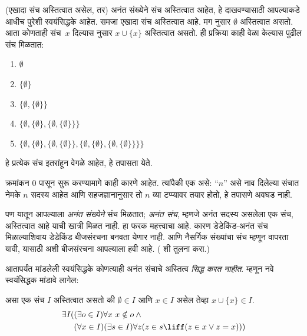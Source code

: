 \documentclass[../../../include/open-logic-section]{subfiles}
\begin{document}

(एखादा संच अस्तित्वात असेल, तर) अनंत संख्येने संच अस्तित्वात आहेत, हे दाखवण्यासाठी आपल्याकडे आधीच पुरेशी स्वयंसिद्धके आहेत. समजा एखादा संच अस्तित्वात आहे. मग  नुसार $\emptyset$ अस्तित्वात असतो. आता कोणताही संच~$x$ दिल्यास  नुसार $x \cup \{x\}$ अस्तित्वात असतो. ही प्रक्रिया काही वेळा केल्यास पुढील संच मिळतात:
\begin{enumerate}
	\item[0.] $\emptyset$ %
	\item[1.] $ \{\emptyset\}$ %
	\item[2.] $\{\emptyset, \{\emptyset\}\}$ %
	\item[3.] $\{\emptyset, \{\emptyset\}, \{\emptyset, \{\emptyset\}\}\}$ %
	\item[4.] $\{\emptyset, \{\emptyset\}, \{\emptyset, \{\emptyset\}\}, \{\emptyset, \{\emptyset\}, \{\emptyset, \{\emptyset\}\}\}\}$%
\end{enumerate}
हे प्रत्येक संच इतरांहून वेगळे आहेत, हे तपासता येते.

क्रमांकन $0$ पासून सुरू करण्यामागे काही कारणे आहेत. त्यांपैकी एक असे: ``$n$'' असे नाव दिलेल्या संचात नेमके $n$ सदस्य आहेत आणि सहजज्ञानानुसार तो $n$ व्या टप्प्यावर तयार होतो, हे तपासणे अवघड नाही.

पण यातून आपल्याला \emph{अनंत संख्येने} संच मिळतात; \emph{अनंत संच}, म्हणजे अनंत सदस्य असलेला एक संच, अस्तित्वात आहे याची खात्री मिळत नाही. हा फरक महत्त्वाचा आहे. कारण डेडेकिंड-अनंत संच मिळाल्याशिवाय डेडेकिंड बीजसंरचना बनवता येणार नाही. आणि नैसर्गिक संख्यांचा संच म्हणून वापरता यावी, यासाठी अशी बीजसंरचना आपल्याला हवी आहे. ( शी तुलना करा.)

आतापर्यंत मांडलेली स्वयंसिद्धके कोणत्याही अनंत संचाचे अस्तित्व \emph{सिद्ध करत नाहीत}. म्हणून नवे स्वयंसिद्धक मांडावे लागेल:

\begin{axiom}[अनंतता]
असा एक संच $I$ अस्तित्वात असतो की $\emptyset \in I$ आणि $x \in I$ असेल तेव्हा $x \cup \{x\} \in I$.
\begin{align*}
	\exists I( & (\exists o \in I)\forall x\ x \notin o \land {}\\
	& (\forall x \in I)(\exists s \in I)\forall z(z \in s \liff (z \in x \lor z = x)))
\end{align*}
\end{axiom}
\end{document}
